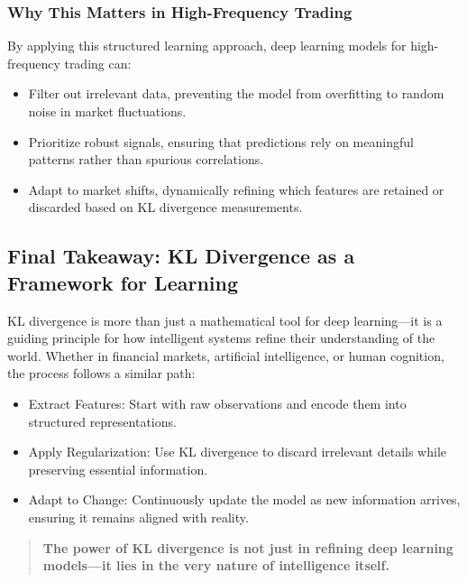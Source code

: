\subsubsection*{Why This Matters in High-Frequency Trading}

By applying this structured learning approach, deep learning models for high-frequency trading can:
\begin{itemize}
    \item Filter out irrelevant data, preventing the model from overfitting to random noise in market fluctuations.
    \item Prioritize robust signals, ensuring that predictions rely on meaningful patterns rather than spurious correlations.
    \item Adapt to market shifts, dynamically refining which features are retained or discarded based on KL divergence measurements.
\end{itemize}

\subsection{Final Takeaway: KL Divergence as a Framework for Learning}

KL divergence is more than just a mathematical tool for deep learning—it is a guiding principle for how intelligent systems refine their understanding of the world. Whether in financial markets, artificial intelligence, or human cognition, the process follows a similar path:

\begin{itemize}
    \item Extract Features: Start with raw observations and encode them into structured representations.
    \item Apply Regularization: Use KL divergence to discard irrelevant details while preserving essential information.
    \item Adapt to Change: Continuously update the model as new information arrives, ensuring it remains aligned with reality.
\end{itemize}

\begin{quote}
\textbf{The power of KL divergence is not just in refining deep learning models—it lies in the very nature of intelligence itself.}
\end{quote}
